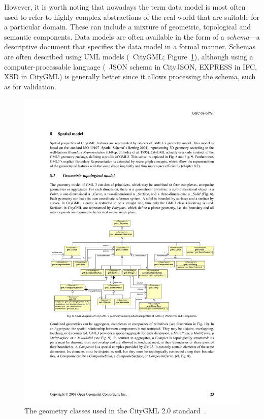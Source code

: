 However, it is worth noting that nowadays the term data model is most often used to refer to highly complex abstractions of the real world that are suitable for a particular domain.
These can include a mixture of geometric, topological and semantic components.
Data models are often available in the form of a \emph{schema}---a descriptive document that specifies the data model in a formal manner.
Schemas are often described using UML models (\eg\ CityGML; Figure~\ref{fig:citygml}), although using a computer-processable language (\eg\ JSON schema in CityJSON, EXPRESS in IFC, XSD in CityGML) is generally better since it allows processing the schema, such as for validation.

\begin{figure}
\centering
\includegraphics[width=\linewidth]{figs/citygml.pdf}
\caption{The geometry classes used in the CityGML 2.0 standard~\citep{CityGML2.0}.}%
\label{fig:citygml}
\end{figure}

